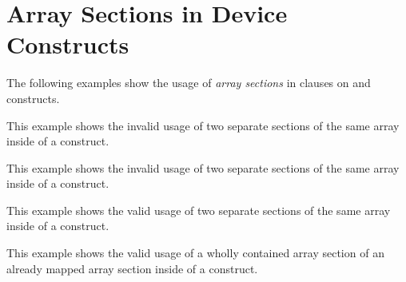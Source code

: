 \section{Array Sections in Device Constructs}
\label{sec:array_sections}

The following examples show the usage of \emph{array sections} in  clauses 
on  and  constructs.

This example shows the invalid usage of two separate sections of the same array 
inside of a  construct.


\clearpage

This example shows the invalid usage of two separate sections of the same array 
inside of a  construct.



This example shows the valid usage of two separate sections of the same array inside 
of a  construct.



This example shows the valid usage of a wholly contained array section of an already 
mapped array section inside of a  construct.



